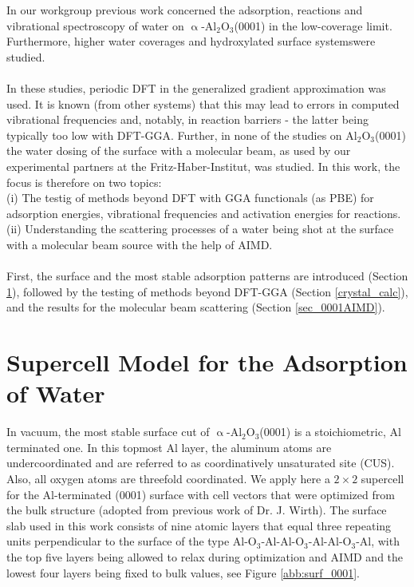 \documentclass[11pt,DIV=13,BCOR=5mm,a4paper,headinclude]{scrbook}
\newcommand\todo[1]{\textcolor{red}{TODO: \textit{{#1}}}}
\begin{document}
In our workgroup previous work concerned the adsorption, reactions and vibrational spectroscopy of water on $\upalpha$-Al$_2$O$_3$(0001) in the low-coverage limit.
Furthermore, higher water coverages and hydroxylated surface systemswere studied\cite{WirthJPCC2012,Wirth2014,Wirth2015,Melani2018}.
\\\\

In these studies, periodic DFT in the generalized gradient approximation was used.
It is known (from other systems) that this may lead to errors in computed vibrational frequencies and, notably, in reaction barriers - the latter being typically too low with DFT-GGA.
Further, in none of the studies on Al$_2$O$_3$(0001) the water dosing of the surface with a molecular beam, as used by our experimental partners at the Fritz-Haber-Institut, was studied.
In this work, the focus is therefore on two topics:
\\
(i) The testig of methods beyond DFT with GGA functionals (as PBE) for adsorption energies, vibrational frequencies and activation energies for reactions.
\\
(ii) Understanding the scattering processes of a water being shot at the surface with a molecular beam source with the help of AIMD.
\\\\
First, the surface and the most stable adsorption patterns are introduced (Section \ref{sec_0001surf}), followed by the testing of methods beyond DFT-GGA (Section \ref{crystal_calc}), and the results for the molecular beam scattering\cite{Heiden0001_2018} (Section \ref{sec_0001AIMD}).
	
\section{Supercell Model for the Adsorption of Water}\label{sec_0001surf}

In vacuum, the most stable surface cut of $\upalpha$-Al$_2$O$_3$(0001) is a stoichiometric, Al terminated one.
In this topmost Al layer, the aluminum atoms are undercoordinated and are referred to as coordinatively unsaturated site (CUS).
Also, all oxygen atoms are threefold coordinated. %
We apply here a $2\times 2$ supercell for the Al-terminated (0001) surface with cell vectors that were optimized from the bulk structure (adopted from previous work of Dr. J. Wirth\cite{WirthJPCC2012}).
The surface slab used in this work consists of nine atomic layers that equal three repeating units perpendicular to the surface of the type Al-O$_3$-Al-Al-O$_3$-Al-Al-O$_3$-Al, with the top five layers being allowed to relax during optimization and AIMD and the lowest four layers being fixed to bulk values, see Figure \ref{abb:surf_0001}.
\end{document}
